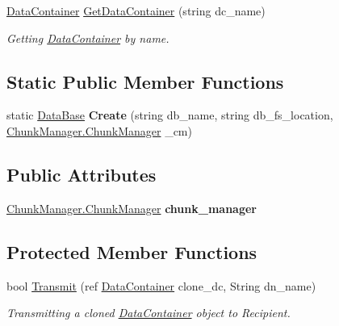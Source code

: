 \begin{DoxyCompactItemize}
\item 
\hyperlink{class_dwarf_d_b_1_1_data_structures_1_1_data_container}{DataContainer} \hyperlink{class_dwarf_d_b_1_1_data_structures_1_1_data_base_aa554e79937460eb937b90d81093019b5}{GetDataContainer} (string dc\_\-name)
\begin{DoxyCompactList}\small\item\em Getting \hyperlink{class_dwarf_d_b_1_1_data_structures_1_1_data_container}{DataContainer} by name. \item\end{DoxyCompactList}\end{DoxyCompactItemize}
\subsection*{Static Public Member Functions}
\begin{DoxyCompactItemize}
\item 
\hypertarget{class_dwarf_d_b_1_1_data_structures_1_1_data_base_a5075320dc80d4950c8cffc23a9ca44d7}{
static \hyperlink{class_dwarf_d_b_1_1_data_structures_1_1_data_base}{DataBase} {\bfseries Create} (string db\_\-name, string db\_\-fs\_\-location, \hyperlink{class_dwarf_d_b_1_1_chunk_manager_1_1_chunk_manager}{ChunkManager.ChunkManager} \_\-cm)}
\label{class_dwarf_d_b_1_1_data_structures_1_1_data_base_a5075320dc80d4950c8cffc23a9ca44d7}

\end{DoxyCompactItemize}
\subsection*{Public Attributes}
\begin{DoxyCompactItemize}
\item 
\hypertarget{class_dwarf_d_b_1_1_data_structures_1_1_data_base_a8ccf11a71c383f6f1ac6870022a261c3}{
\hyperlink{class_dwarf_d_b_1_1_chunk_manager_1_1_chunk_manager}{ChunkManager.ChunkManager} {\bfseries chunk\_\-manager}}
\label{class_dwarf_d_b_1_1_data_structures_1_1_data_base_a8ccf11a71c383f6f1ac6870022a261c3}

\end{DoxyCompactItemize}
\subsection*{Protected Member Functions}
\begin{DoxyCompactItemize}
\item 
bool \hyperlink{class_dwarf_d_b_1_1_data_structures_1_1_data_base_a5eefaebdb94adf4d3b19f29e8f146725}{Transmit} (ref \hyperlink{class_dwarf_d_b_1_1_data_structures_1_1_data_container}{DataContainer} clone\_\-dc, String dn\_\-name)
\begin{DoxyCompactList}\small\item\em Transmitting a cloned \hyperlink{class_dwarf_d_b_1_1_data_structures_1_1_data_container}{DataContainer} object to Recipient. \item\end{DoxyCompactList}\end{DoxyCompactItemize}
